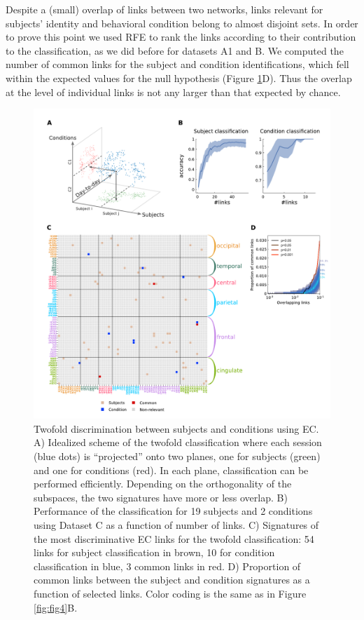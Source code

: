 \documentclass[12pt, a4paper, final, fleqn]{article}
\begin{document}
Despite a (small) overlap of links between two networks, links relevant for subjects' identity and behavioral condition belong to almost disjoint
sets. In order to prove this point we used RFE to rank the links according to their contribution to the
classification, as we did before for datasets A1 and B. We computed the number of common links for the subject and
condition identifications, which fell within the expected values for the null
hypothesis (Figure \ref{fig:fig5}D). Thus the overlap at the level of individual links is not any larger than that 
expected by chance.

\begin{figure}[htpb]
	\centering
	\includegraphics[width=0.9\columnwidth]{fig5}
	\caption{Twofold discrimination between subjects and conditions using EC.  A) Idealized
scheme of the twofold classification where each session (blue dots) is
“projected” onto two planes, one for subjects (green) and one for conditions
(red). In each plane, classification can be performed efficiently. Depending
on the orthogonality of the subspaces, the two signatures have more or less
overlap. B) Performance of the classification for 19 subjects and 2 conditions
using Dataset C as a function of number of links. C)
Signatures of the most discriminative EC links for the twofold classification: 54 links for subject
classification in brown, 10 for condition classification in blue, 3 common
links in red. D) Proportion of common links between the subject and
condition signatures as a function of selected links. Color coding is the same as in Figure \ref{fig:fig4}B.
}
	\label{fig:fig5}
\end{figure}
\end{document}
